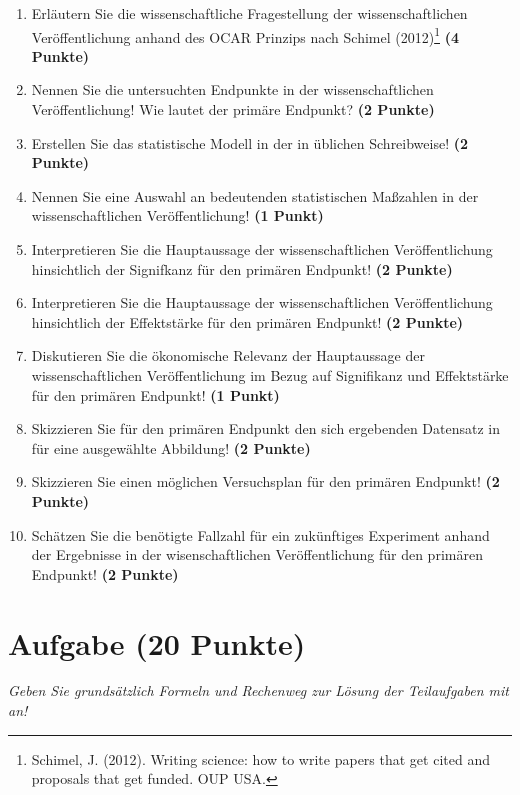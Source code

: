 \documentclass[a4paper, 9pt]{scrartcl}\usepackage[]{graphicx}\usepackage[]{xcolor}
\begin{document}
\begin{enumerate}
  \setcounter{enumi}{0}
  \item Erläutern Sie die wissenschaftliche Fragestellung der wissenschaftlichen Veröffentlichung anhand des OCAR Prinzips nach Schimel (2012)\footnote{Schimel, J. (2012). Writing science: how to write papers that get cited and proposals that get funded. OUP USA.} \textbf{(4 Punkte)}
  \item Nennen Sie die untersuchten Endpunkte in der wissenschaftlichen Veröffentlichung! Wie lautet der primäre Endpunkt? \textbf{(2 Punkte)} 
\item Erstellen Sie das statistische Modell in der in \Rlogo üblichen Schreibweise! \textbf{(2 Punkte)}
  \item Nennen Sie eine Auswahl an bedeutenden statistischen Maßzahlen in der wissenschaftlichen Veröffentlichung! \textbf{(1 Punkt)}
  \item Interpretieren Sie die Hauptaussage der wissenschaftlichen Veröffentlichung hinsichtlich der Signifkanz für den primären Endpunkt! \textbf{(2 Punkte)}
  \item Interpretieren Sie die Hauptaussage der wissenschaftlichen Veröffentlichung hinsichtlich der Effektstärke für den primären Endpunkt! \textbf{(2 Punkte)}
  \item Diskutieren Sie die ökonomische Relevanz der Hauptaussage der wissenschaftlichen Veröffentlichung im Bezug auf Signifikanz und Effektstärke für den primären Endpunkt! \textbf{(1 Punkt)}
  \item Skizzieren Sie für den primären Endpunkt den sich ergebenden Datensatz in \Rlogo für eine ausgewählte Abbildung! \textbf{(2 Punkte)}
\item Skizzieren Sie einen möglichen Versuchsplan für den primären Endpunkt! \textbf{(2 Punkte)}
  \item Schätzen Sie die benötigte Fallzahl für ein zukünftiges Experiment anhand der Ergebnisse in der wisenschaftlichen Veröffentlichung für den primären Endpunkt! \textbf{(2 Punkte)}
\end{enumerate} 
\clearpage

\section{Aufgabe \hfill (20 Punkte)}

\textit{Geben Sie grundsätzlich Formeln und Rechenweg zur Lösung der Teilaufgaben mit an!} \\[1Ex]
 
\end{document}
